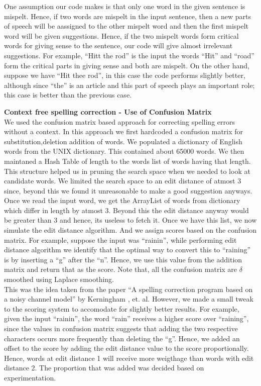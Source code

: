 \documentclass[a4paper,10pt]{article}
\begin{document}
  One assumption our code makes is that only one word in the given sentence is mispelt. Hence, if two words are mispelt in the input sentence, then
  a new parts of speech will be aassigned to the other mispelt word and then the first mispelt word will be given suggestions. Hence, if the two mispelt
  words form critical words for giving sense to the sentence, our code will give almost irrelevant suggestions. For example, ``Hitt the rod'' is the input
  the words ``Hit'' and ``road'' form the critical parts in giving sense and both are mispelt. On the other hand, suppose we have ``Hit thee rod'', in this
  case the code performs slightly better, although since ``the'' is an article and this part of speech plays an important role; this case is better than the
  previous case.\newline
  
 
 
 \textbf{Context free spelling correction - Use of Confusion Matrix} \\
    We used the confusion matrix based approach for correcting spelling errors without a context. In this approach we first hardcoded a confusion matrix for substitution,deletion addition of words. We populated a dictionary of English words from the UNIX dictionary. This contained about 65000 words.
We then maintaned a Hash Table of length to the words list of words having that length. This structure helped us in pruning the search space when we needed
to look at candidate words. We limited the search space to an edit distance of atmost 3 since, beyond this we found it unreasonable to make a good
suggestion anyways.\\

Once we read the input word, we get the ArrayList of words from dictionary which differ in length by atmost 3. Beyond this the edit distance anyway would be
greater than 3 and hence, its useless to fetch it. Once we have this list, we now simulate the edit distance algorithm. And we assign scores based on the
confusion matrix. For example, suppose the input was ``rainin'', while performing edit distance algorithm we identify that the optimal way to convert this
to ``raining'' is by inserting a ``g'' after the ``n''. Hence, we use this value from the addition matrix and return that as the score. Note that, all
the confusion matrix are $\delta$ smoothed using Laplace smoothing. \\

This was the idea taken from the paper ``A spelling correction program based on a noisy
channel model'' by Kerningham , et. al. However, we made a small tweak to the scoring system to accomodate for slightly better results. For example,
given the input ``rainin'', the word ``rain'' receives a higher score over ``raining'', since the values in confusion matrix suggests that adding the
two respective characters occurs more frequently than deleting the ``g''. Hence, we added an offset to the score by adding the edit distance value to
the score proportionally. Hence, words at edit distance 1 will receive more weigthage than words with edit distance 2. The proportion that was added
was decided based on experimentation. \\
\end{document}
